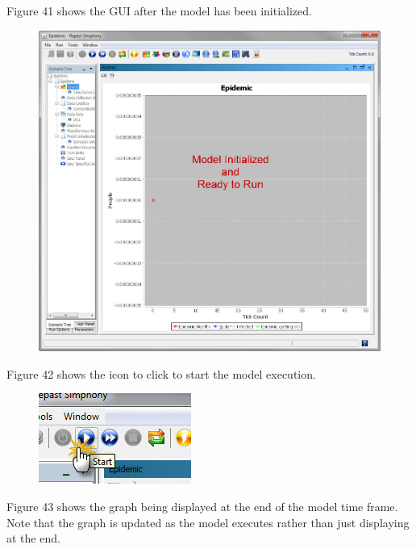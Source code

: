 \documentclass[11pt]{amsart}
\begin{document}
Figure 41 shows the GUI after the model has been initialized.


\begin{figure}[ht]
\begin{center}
\vspace{.2in}
\centerline {
\includegraphics[totalheight=0.3\textheight]{images/041.jpg}
}
\caption{}
\label{fig:041}
\end{center}
\end{figure}

Figure 42 shows the icon to click to start the model execution.


\begin{figure}[ht]
\begin{center}
\vspace{.2in}
\centerline {
\includegraphics[totalheight=0.3\textheight]{images/042.jpg}
}
\caption{}
\label{fig:042}
\end{center}
\end{figure}

Figure 43 shows the graph being displayed at the end of the model time frame. Note that the graph is updated as the model executes rather than just displaying at the end.
\end{document}
